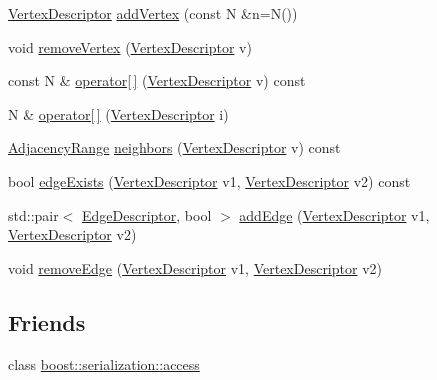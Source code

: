 \begin{DoxyCompactItemize}
\item 
\hyperlink{classpan_1_1detail_1_1_graph_a462f566d2f6cb0e51c85c8e9fa5382ab}{Vertex\+Descriptor} \hyperlink{classpan_1_1detail_1_1_graph_a3848d9e9acbfeff14634de5cc0395614}{add\+Vertex} (const N \&n=N())
\item 
void \hyperlink{classpan_1_1detail_1_1_graph_ad2e6731b123860e589849f965e42ec8f}{remove\+Vertex} (\hyperlink{classpan_1_1detail_1_1_graph_a462f566d2f6cb0e51c85c8e9fa5382ab}{Vertex\+Descriptor} v)
\item 
const N \& \hyperlink{classpan_1_1detail_1_1_graph_a912822dad64cd9df929011c45e5a532d}{operator\mbox{[}$\,$\mbox{]}} (\hyperlink{classpan_1_1detail_1_1_graph_a462f566d2f6cb0e51c85c8e9fa5382ab}{Vertex\+Descriptor} v) const
\item 
N \& \hyperlink{classpan_1_1detail_1_1_graph_a5e902bbe95d75a0af812af3fd95314c2}{operator\mbox{[}$\,$\mbox{]}} (\hyperlink{classpan_1_1detail_1_1_graph_a462f566d2f6cb0e51c85c8e9fa5382ab}{Vertex\+Descriptor} i)
\item 
\hyperlink{classpan_1_1detail_1_1_graph_abcc5afe3ac75ffca9c7d845a1a2217a5}{Adjacency\+Range} \hyperlink{classpan_1_1detail_1_1_graph_a858109b2a94a386e74717f23be2a0754}{neighbors} (\hyperlink{classpan_1_1detail_1_1_graph_a462f566d2f6cb0e51c85c8e9fa5382ab}{Vertex\+Descriptor} v) const
\item 
bool \hyperlink{classpan_1_1detail_1_1_graph_accd48ccab28236e9f0107beea6ae4119}{edge\+Exists} (\hyperlink{classpan_1_1detail_1_1_graph_a462f566d2f6cb0e51c85c8e9fa5382ab}{Vertex\+Descriptor} v1, \hyperlink{classpan_1_1detail_1_1_graph_a462f566d2f6cb0e51c85c8e9fa5382ab}{Vertex\+Descriptor} v2) const
\item 
std\+::pair$<$ \hyperlink{classpan_1_1detail_1_1_graph_a21d6fe3d33512e98e8578df1f4d8b810}{Edge\+Descriptor}, bool $>$ \hyperlink{classpan_1_1detail_1_1_graph_a581e01f695352af2a25dd2547f586c51}{add\+Edge} (\hyperlink{classpan_1_1detail_1_1_graph_a462f566d2f6cb0e51c85c8e9fa5382ab}{Vertex\+Descriptor} v1, \hyperlink{classpan_1_1detail_1_1_graph_a462f566d2f6cb0e51c85c8e9fa5382ab}{Vertex\+Descriptor} v2)
\item 
void \hyperlink{classpan_1_1detail_1_1_graph_a809fe9551538da78d405b1d9ead964f5}{remove\+Edge} (\hyperlink{classpan_1_1detail_1_1_graph_a462f566d2f6cb0e51c85c8e9fa5382ab}{Vertex\+Descriptor} v1, \hyperlink{classpan_1_1detail_1_1_graph_a462f566d2f6cb0e51c85c8e9fa5382ab}{Vertex\+Descriptor} v2)
\end{DoxyCompactItemize}
\subsection*{Friends}
\begin{DoxyCompactItemize}
\item 
class \hyperlink{classpan_1_1detail_1_1_graph_ac98d07dd8f7b70e16ccb9a01abf56b9c}{boost\+::serialization\+::access}
\end{DoxyCompactItemize}


